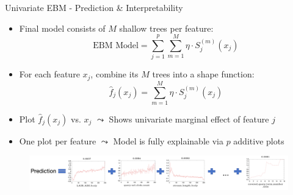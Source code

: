 \documentclass[11pt,compress,t,notes=noshow, aspectratio=169, xcolor=table]{beamer}
\begin{document}




\begin{frame}{Univariate EBM - Prediction \& Interpretability}
\begin{itemize}
    \item Final model consists of $M$ shallow trees per feature:
    $$
    \text{EBM Model} = \sum_{j=1}^p \sum_{m=1}^M \eta \cdot S_j^{(m)}(x_j)
    $$
    \item For each feature $x_j$, combine its $M$ trees into a shape function:
    $$
    \hat{f}_j(x_j) = \sum_{m=1}^M \eta \cdot S_j^{(m)}(x_j)
    $$
    \item Plot $\hat{f}_j(x_j)$ vs. $x_j$ $\leadsto$ Shows univariate marginal effect of feature $j$
    \item One plot per feature $\leadsto$ Model is fully explainable via $p$ additive plots
\end{itemize}

\medskip

\begin{figure}
    \centering
    \includegraphics[width=\textwidth]{figure/ebm_prediction.png}
\end{figure}
\end{frame}
\end{document}
